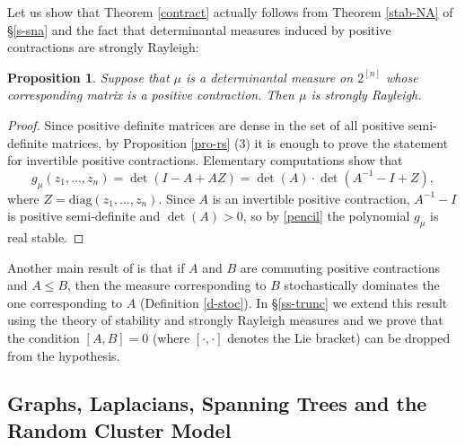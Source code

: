 \documentclass[10pt,reqno]{amsart}
\theoremstyle{plain}
\newtheorem{proposition}[theorem]{Proposition}
\theoremstyle{definition}
\theoremstyle{remark}
\begin{document}
Let us show that Theorem \ref{contract} actually follows from 
Theorem \ref{stab-NA} of \S \ref{s-sna} and the fact that determinantal 
measures induced by positive contractions are strongly Rayleigh: 

\begin{proposition}\label{det-stab}
Suppose that  $\mu$ is a determinantal measure on $2^{[n]}$ whose
corresponding matrix is a positive contraction. Then $\mu$ is strongly 
Rayleigh.
\end{proposition}

\begin{proof}
Since positive definite matrices are dense in the set of all positive 
semi-definite matrices, by Proposition \ref{pro-rs} (3) it is enough to prove 
the statement for invertible
positive contractions. Elementary computations show that 
$$g_\mu(z_1,\ldots,z_n)=\det(I-A+AZ)=\det(A)\cdot \det(A^{-1}-I+Z),$$ 
where $Z=\text{diag}(z_1,\ldots,z_n)$. 
Since $A$ is an invertible positive contraction, $A^{-1}-I$ is positive 
semi-definite and
$\det(A)>0$, so by \eqref{pencil} the polynomial $g_\mu$ is 
real stable. 
\end{proof}

Another main result of \cite{Lyons} is that if $A$ and $B$ are commuting 
positive contractions and $A \leq B$, 
then the measure corresponding to $B$ stochastically dominates
the one corresponding to $A$ (Definition \ref{d-stoc}). In 
\S \ref{ss-trunc} we extend this result using the theory of stability and 
strongly Rayleigh measures and we prove that the condition 
$[A,B]=0$ (where $[\cdot,\cdot]$ denotes the Lie bracket)
can be dropped from the hypothesis. 

\subsection{Graphs, Laplacians, Spanning Trees and the Random Cluster 
Model}\label{ss-trees}
\end{document}
